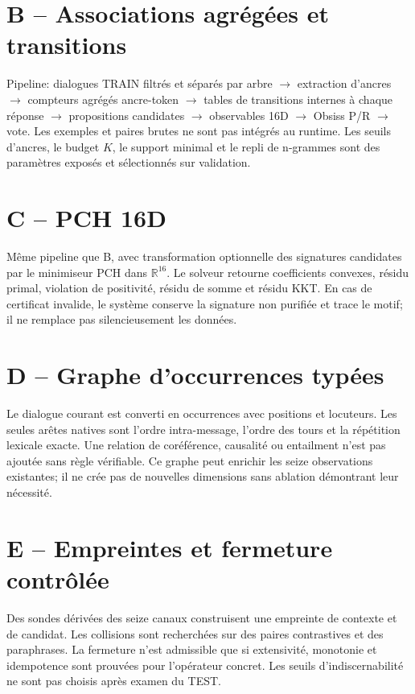 \documentclass[11pt,a4paper]{report}
\begin{document}
\section{B -- Associations agrégées et transitions}
Pipeline: dialogues TRAIN filtrés et séparés par arbre $\to$ extraction d'ancres $\to$ compteurs agrégés ancre-token $\to$ tables de transitions internes à chaque réponse $\to$ propositions candidates $\to$ observables 16D $\to$ Obsiss P/R $\to$ vote. Les exemples et paires brutes ne sont pas intégrés au runtime. Les seuils d'ancres, le budget $K$, le support minimal et le repli de n-grammes sont des paramètres exposés et sélectionnés sur validation.

\section{C -- PCH 16D}
Même pipeline que B, avec transformation optionnelle des signatures candidates par le minimiseur PCH dans $\mathbb R^{16}$. Le solveur retourne coefficients convexes, résidu primal, violation de positivité, résidu de somme et résidu KKT. En cas de certificat invalide, le système conserve la signature non purifiée et trace le motif; il ne remplace pas silencieusement les données.

\section{D -- Graphe d'occurrences typées}
Le dialogue courant est converti en occurrences avec positions et locuteurs. Les seules arêtes natives sont l'ordre intra-message, l'ordre des tours et la répétition lexicale exacte. Une relation de coréférence, causalité ou entailment n'est pas ajoutée sans règle vérifiable. Ce graphe peut enrichir les seize observations existantes; il ne crée pas de nouvelles dimensions sans ablation démontrant leur nécessité.

\section{E -- Empreintes et fermeture contrôlée}
Des sondes dérivées des seize canaux construisent une empreinte de contexte et de candidat. Les collisions sont recherchées sur des paires contrastives et des paraphrases. La fermeture n'est admissible que si extensivité, monotonie et idempotence sont prouvées pour l'opérateur concret. Les seuils d'indiscernabilité ne sont pas choisis après examen du TEST.
\end{document}
